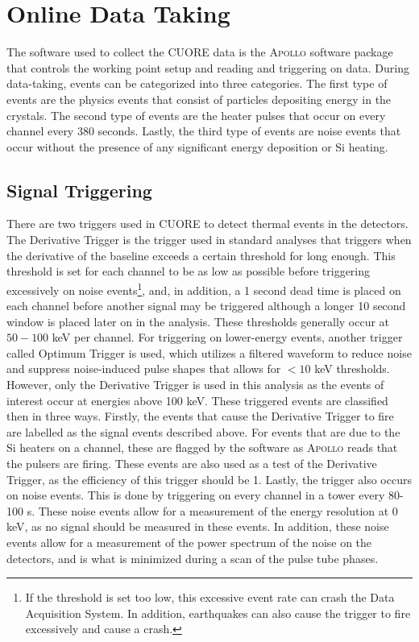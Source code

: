 \section{Online Data Taking}
\label{sec:Online Data Taking}
The software used to collect the CUORE data is the \textsc{Apollo} software package that controls the working point setup and reading and triggering on data.
During data-taking, events can be categorized into three categories.
The first type of events are the physics events that consist of particles depositing energy in the crystals.
The second type of events are the heater pulses that occur on every channel every 380 seconds.
Lastly, the third type of events are noise events that occur without the presence of any significant energy deposition or Si heating. 
\subsection*{Signal Triggering}
There are two triggers used in CUORE to detect thermal events in the detectors.
The Derivative Trigger is the trigger used in standard analyses that triggers when the derivative of the baseline exceeds a certain threshold for long enough.
This threshold is set for each channel to be as low as possible before triggering excessively on noise events\footnote{If the threshold is set too low, this excessive event rate can crash the Data Acquisition System.
In addition, earthquakes can also cause the trigger to fire excessively and cause a crash.}, and, in addition, a 1 second dead time is placed on each channel before another signal may be triggered although a longer 10 second window is placed later on in the analysis.
These thresholds generally occur at $50-100$ keV per channel.
For triggering on lower-energy events, another trigger called Optimum Trigger is used, which utilizes a filtered waveform to reduce noise and suppress noise-induced pulse shapes that allows for $<10$ keV thresholds.
However, only the Derivative Trigger is used in this analysis as the events of interest occur at energies above 100 keV. 
These triggered events are classified then in three ways.
Firstly, the events that cause the Derivative Trigger to fire are labelled as the signal events described above.
For events that are due to the Si heaters on a channel, these are flagged by the software as \textsc{Apollo} reads that the pulsers are firing.
These events are also used as a test of the Derivative Trigger, as the efficiency of this trigger should be 1.
Lastly, the trigger also occurs on noise events.
This is done by triggering on every channel in a tower every 80-100 s.
These noise events allow for a measurement of the energy resolution at 0 keV, as no signal should be measured in these events.
In addition, these noise events allow for a measurement of the power spectrum of the noise on the detectors, and is what is minimized during a scan of the pulse tube phases.

